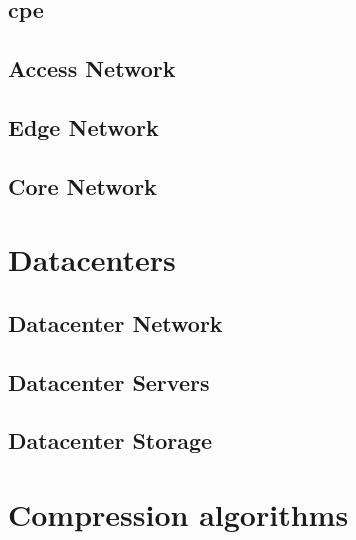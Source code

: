 \subsection{\acl{cpe}}

\subsection{Access Network}

\subsection{Edge Network}

\subsection{Core Network}

\section{Datacenters}

\subsection{Datacenter Network}

\subsection{Datacenter Servers}

\subsection{Datacenter Storage}

\section{Compression algorithms}
